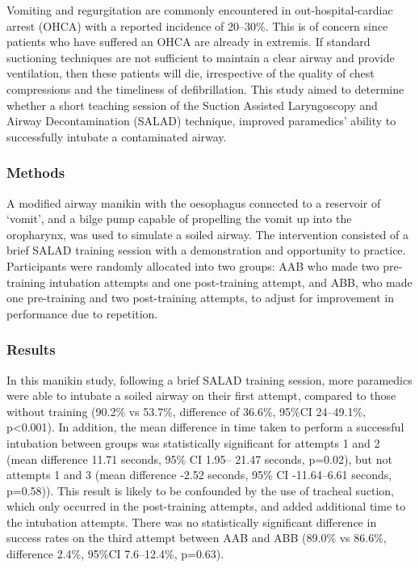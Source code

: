 \documentclass[]{article}
\begin{document}
Vomiting and regurgitation are commonly encountered in
out-hospital-cardiac arrest (OHCA) with a reported incidence of
20--30\%. This is of concern since patients who have suffered an OHCA
are already in extremis. If standard suctioning techniques are not
sufficient to maintain a clear airway and provide ventilation, then
these patients will die, irrespective of the quality of chest
compressions and the timeliness of defibrillation. This study aimed to
determine whether a short teaching session of the Suction Assisted
Laryngoscopy and Airway Decontamination (SALAD) technique, improved
paramedics' ability to successfully intubate a contaminated airway.

\hypertarget{methods}{%
\subsubsection{Methods}\label{methods}}

A modified airway manikin with the oesophagus connected to a reservoir
of `vomit', and a bilge pump capable of propelling the vomit up into the
oropharynx, was used to simulate a soiled airway. The intervention
consisted of a brief SALAD training session with a demonstration and
opportunity to practice. Participants were randomly allocated into two
groups: AAB who made two pre-training intubation attempts and one
post-training attempt, and ABB, who made one pre-training and two
post-training attempts, to adjust for improvement in performance due to
repetition.

\hypertarget{results}{%
\subsubsection{Results}\label{results}}

In this manikin study, following a brief SALAD training session, more
paramedics were able to intubate a soiled airway on their first attempt,
compared to those without training (90.2\% vs 53.7\%, difference of
36.6\%, 95\%CI 24--49.1\%, p\textless{}0.001). In addition, the mean
difference in time taken to perform a successful intubation between
groups was statistically significant for attempts 1 and 2 (mean
difference 11.71 seconds, 95\% CI 1.95-- 21.47 seconds, p=0.02), but not
attempts 1 and 3 (mean difference -2.52 seconds, 95\% CI -11.64--6.61
seconds, p=0.58)). This result is likely to be confounded by the use of
tracheal suction, which only occurred in the post-training attempts, and
added additional time to the intubation attempts. There was no
statistically significant difference in success rates on the third
attempt between AAB and ABB (89.0\% vs 86.6\%, difference 2.4\%, 95\%CI
7.6--12.4\%, p=0.63).
\end{document}

